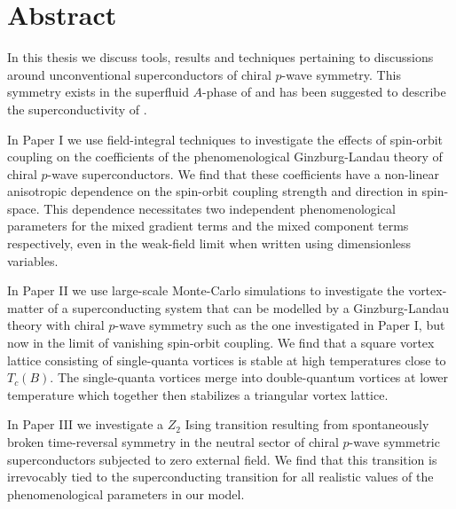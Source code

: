 \chapter*{Abstract}\noindent
%
In this thesis we discuss tools, results and techniques pertaining to discussions around unconventional superconductors of chiral $p$-wave symmetry.
This symmetry exists in the superfluid $A$-phase of  and has been suggested to describe the superconductivity of .

In Paper I we use field-integral techniques to investigate the effects of spin-orbit coupling on the coefficients of the phenomenological
Ginzburg-Landau theory of chiral $p$-wave superconductors. We find that these coefficients have a non-linear anisotropic dependence on the
spin-orbit coupling strength and direction in spin-space. This dependence necessitates two independent phenomenological parameters for
the mixed gradient terms and the mixed component terms respectively, even in the weak-field limit when written using
dimensionless variables.

In Paper II we use large-scale Monte-Carlo simulations to investigate the vortex-matter of a superconducting system that can be modelled
by a Ginzburg-Landau theory with chiral $p$-wave symmetry such as the one investigated in Paper I, but now in the limit of vanishing
spin-orbit coupling. We find that a square vortex lattice consisting of single-quanta vortices is stable at high temperatures close to
$T_c(B)$. The single-quanta vortices merge into double-quantum vortices at lower temperature which together then stabilizes a triangular
vortex lattice.

In Paper III we investigate a $Z_2$ Ising transition resulting from spontaneously broken time-reversal symmetry in the neutral sector
of chiral $p$-wave symmetric superconductors subjected to zero external field. We find that this transition is irrevocably tied to
the superconducting transition for all realistic values of the phenomenological parameters in our model.

